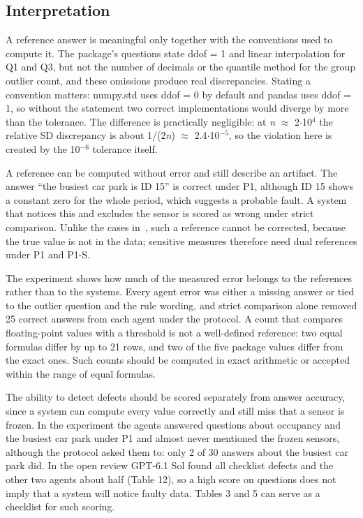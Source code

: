 \documentclass[default]{subfiles}
\begin{document}
{\subsection{Interpretation}

A reference answer is meaningful only together with the conventions used to compute it. The package's questions state ddof = 1 and linear interpolation for Q1 and Q3, but not the number of decimals or the quantile method for the group outlier count, and these omissions produce real discrepancies. Stating a convention matters: numpy.std uses ddof = 0 by default and pandas uses ddof = 1, so without the statement two correct implementations would diverge by more than the tolerance. The difference is practically negligible: at \emph{n} $\approx$ 2$\cdot$10$^{4}$ the relative SD discrepancy is about 1/(2\emph{n}) $\approx$ 2.4$\cdot$10$^{-5}$, so the violation here is created by the 10$^{-6}$ tolerance itself.

A reference can be computed without error and still describe an artifact. The answer ``the busiest car park is ID 15'' is correct under P1, although ID 15 shows a constant zero for the whole period, which suggests a probable fault. A system that notices this and excludes the sensor is scored as wrong under strict comparison. Unlike the cases in~\cite{northcutt2021,wretblad2024}, such a reference cannot be corrected, because the true value is not in the data; sensitive measures therefore need dual references under P1 and P1-S.

The experiment shows how much of the measured error belongs to the references rather than to the systems. Every agent error was either a missing answer or tied to the outlier question and the rule wording, and strict comparison alone removed 25 correct answers from each agent under the protocol. A count that compares floating-point values with a threshold is not a well-defined reference: two equal formulas differ by up to 21 rows, and two of the five package values differ from the exact ones. Such counts should be computed in exact arithmetic or accepted within the range of equal formulas.

The ability to detect defects should be scored separately from answer accuracy, since a system can compute every value correctly and still miss that a sensor is frozen. In the experiment the agents answered questions about occupancy and the busiest car park under P1 and almost never mentioned the frozen sensors, although the protocol asked them to: only 2 of 30 answers about the busiest car park did. In the open review GPT-6.1 Sol found all checklist defects and the other two agents about half (Table 12), so a high score on questions does not imply that a system will notice faulty data. Tables 3 and 5 can serve as a checklist for such scoring.

}
\end{document}
